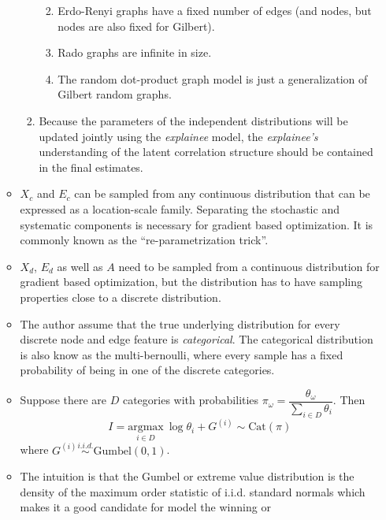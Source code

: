 \documentclass[
  11pt,
  letterpaper,
]{article}
\providecommand{\tightlist}{%
  \setlength{\itemsep}{0pt}\setlength{\parskip}{0pt}}\usepackage{longtable,booktabs,array}
\begin{document}
\begin{itemize}
\begin{itemize}
\begin{enumerate}
      \begin{enumerate}
      \def\labelenumii{\alph{enumii}.}
      \tightlist
      \item
        Erdo-Renyi graphs have a fixed number of edges (and nodes, but
        nodes are also fixed for Gilbert).
      \item
        Rado graphs are infinite in size.
      \item
        The random dot-product graph model is just a generalization of
        Gilbert random graphs.
      \end{enumerate}
    \item
      Because the parameters of the independent distributions will be
      updated jointly using the \emph{explainee} model, the
      \emph{explainee's} understanding of the latent correlation
      structure should be contained in the final estimates.
    \end{enumerate}
  \item
    \(X_c\) and \(E_c\) can be sampled from any continuous distribution
    that can be expressed as a location-scale family. Separating the
    stochastic and systematic components is necessary for gradient based
    optimization. It is commonly known as the ``re-parametrization
    trick''.
  \item
    \(X_d\), \(E_d\) as well as \(A\) need to be sampled from a
    continuous distribution for gradient based optimization, but the
    distribution has to have sampling properties close to a discrete
    distribution.
  \item
    The author assume that the true underlying distribution for every
    discrete node and edge feature is \emph{categorical}. The
    categorical distribution is also know as the multi-bernoulli, where
    every sample has a fixed probability of being in one of the discrete
    categories.
  \item
    Suppose there are \(D\) categories with probabilities
    \(\pi_\omega = \dfrac{\theta_\omega}{\sum_{i \in D}\theta_i}\). Then
    \begin{equation}
          I = \underset{i \in D}{\text{argmax}} \ \log \theta_i + G^{(i)} 
              \sim \text{Cat}(\pi)
      \end{equation} where
    \(G^{(i)} \overset{i.i.d.}{\sim} \text{Gumbel}(0, 1)\).
  \item
    The intuition is that the Gumbel or extreme value distribution is
    the density of the maximum order statistic of i.i.d. standard
    normals which makes it a good candidate for model the winning or

\end{itemize}
\end{itemize}
\end{document}
